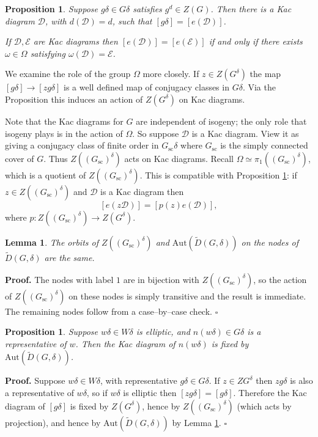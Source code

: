 \documentclass[10pt,leqno]{article}
\newtheorem{lemma}[equation]{Lemma}
\newtheorem{proposition}[equation]{Proposition}
\newcommand{\qed}{\hfill $\square$ \medskip}
\newenvironment{proof}[1][Proof]{\noindent\textbf{#1.} }{\qed}
\newcommand{\Aut}{\text{Aut}}
\newcommand{\D}{\mathcal D}
\newcommand{\Gsc}{G_{\text{sc}}}
\newcommand\wt{\widetilde}
\newcommand{\Daffine}{\wt D(G,\delta)}
\begin{document}
\begin{proposition}
  \label{p:kac}
Suppose $g\delta\in G\delta$ satisfies $g^d\in Z(G)$. Then there is a Kac diagram $\D$,
with $d(\D)=d$, such that $[g\delta]=[e(\D)]$.

If $\D,\mathcal E$ are Kac diagrams then $[e(\D)]=[e(\mathcal E)]$ if and only if
there exists $\omega\in \Omega$ satisfying $\omega(\D)=\mathcal E$.
\end{proposition}

We examine the role of the group $\Omega$ more closely.  If
$z\in Z(G^\delta)$ the map $[g\delta]\rightarrow [zg\delta]$ is a well
defined map of conjugacy classes in $G\delta$. Via the Proposition
this induces an action of $Z(G^\delta)$ on Kac diagrams.

Note that the Kac diagrams for $G$ are independent of isogeny; the
only role that isogeny plays is in the action of $\Omega$.  So suppose
$\D$ is a Kac diagram. View it as giving a conjugacy class of finite
order in $\Gsc\delta$ where $\Gsc$ is the simply connected cover of
$G$.  Thus $Z((\Gsc)^\delta)$ acts on Kac diagrams. Recall
$\Omega\simeq \pi_1((\Gsc)^\delta)$, which is a quotient of
$Z((\Gsc)^\delta)$.
This is compatible with Proposition \ref{p:kac}: if $z\in Z((\Gsc)^\delta)$ and $\D$ is a Kac diagram then
$$
[e(z\D)] = [p(z)e(\D)],
$$
where $p:Z((\Gsc)^\delta)\rightarrow Z(G^\delta)$. 

\begin{lemma}\label{6.7}
The orbits of  $Z((\Gsc)^\delta)$  and  $\Aut(\Daffine)$  on  the nodes of $\Daffine$
are the same.
\end{lemma}

\begin{proof}
The nodes with label $1$ are in bijection with $Z((\Gsc)^\delta)$,
so the action of $Z((\Gsc)^\delta)$ on these nodes is simply
transitive and the result is immediate.
The remaining nodes follow from a case--by--case check.
\end{proof}



\begin{proposition}
\label{p:fixed}
Suppose $w\delta\in W\delta$ is elliptic, and $n(w\delta)\in G\delta$ is a representative of $w$.
Then the Kac diagram of $n(w\delta)$ is fixed by $\Aut(\Daffine)$.
\end{proposition}

\begin{proof}
Suppose $w\delta\in W\delta$, with representative
$g\delta\in G\delta$.  If $z\in ZG^\delta$ then $zg\delta$ is also a
representative of $w\delta$, so if $w\delta$ is elliptic
then $[zg\delta]=[g\delta]$.  Therefore the Kac diagram of $[g\delta]$ is
fixed by $Z(G^\delta)$, hence by $Z((\Gsc)^\delta)$ (which acts by
projection), and hence by $\Aut(\Daffine)$ by 
Lemma \ref{6.7}.
\end{proof}
\end{document}
